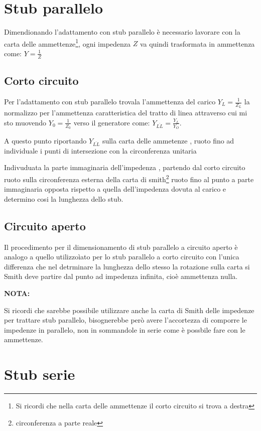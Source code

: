 \documentclass[10pt,a4paper]{report}
\begin{document}
	\section{Stub parallelo}

		Dimendionando l'adattamento con stub parallelo è necessario lavorare con la carta delle ammettenze\footnote{Si ricordi che nella carta delle ammettenze il corto circuito si trova a destra}, ogni impedenza $Z$ va quindi trasformata in ammettenza come: $Y=\frac{1}{Z}$

		\subsection{Corto circuito}
				

			Per l'adattamento con stub parallelo trovala l'ammettenza del carico $Y_L=\frac{1}{Z_L}$ la normalizzo per l'ammettenza caratteristica del tratto di linea attraverso cui mi sto muovendo  $Y_0=\frac{1}{Z_0}$ verso il generatore come: $Y_{\overline{LL}}=\frac{Y_L}{Y_O}$.

			A questo punto riportando $Y_{\overline{LL}}$ sulla carta delle ammetenze , ruoto fino ad individuale i punti di intersezione con la circonferenza unitaria

			Indivuduata la parte immaginaria dell'impedenza , partendo dal corto circuito ruoto sulla circonferenza esterna della carta di smith\footnote{circonferenza a parte reale} ruoto fino al punto a parte immaginaria opposta rispetto a quella dell'impedenza dovuta al carico e determino cosi la lunghezza dello stub.

		\subsection{Circuito aperto}

		Il procedimento per il dimensionamento di stub parallelo a circuito aperto è analogo a quello utilizzoìato per lo stub parallelo a corto circuito con l'unica differenza che nel detrminare la lunghezza dello stesso la rotazione sulla carta si Smith deve partire dal punto ad impedenza infinita, cioè ammettenza nulla.

	\textbf{NOTA:}

	Si ricordi che sarebbe possibile utilizzare anche la carta di Smith delle impedenze per trattare stub parallelo, bisognerebbe però avere l'accortezza di comporre le impedenze in parallelo, non in sommandole in serie come è possbile fare con le ammettenze.

	
	\section{Stub serie}
\end{document}
